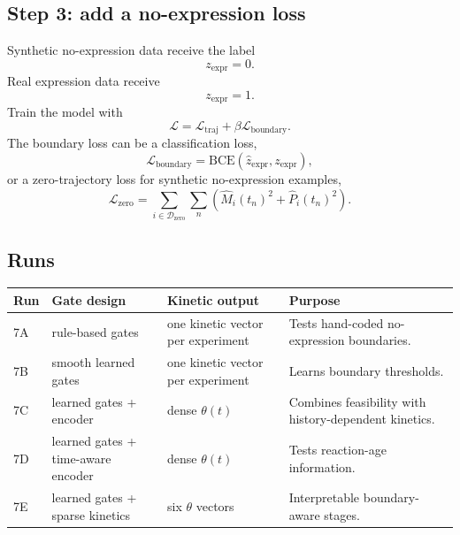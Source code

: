 \documentclass[11pt]{article}
\newcommand{\expr}{\mathrm{expr}}
\newcommand{\BCE}{\mathrm{BCE}}
\begin{document}
\subsection{Step 3: add a no-expression loss}

Synthetic no-expression data receive the label
\begin{equation}
    z_{\expr}=0.
\end{equation}
Real expression data receive
\begin{equation}
    z_{\expr}=1.
\end{equation}
Train the model with
\begin{equation}
    \mathcal{L}=\mathcal{L}_{\mathrm{traj}}+\beta\mathcal{L}_{\mathrm{boundary}}.
\end{equation}
The boundary loss can be a classification loss,
\begin{equation}
    \mathcal{L}_{\mathrm{boundary}}
    =\BCE(\widehat{z}_{\expr},z_{\expr}),
\end{equation}
or a zero-trajectory loss for synthetic no-expression examples,
\begin{equation}
    \mathcal{L}_{\mathrm{zero}}
    =
    \sum_{i\in\mathcal{D}_{\mathrm{zero}}}\sum_n
    \left(\widehat{M}_i(t_n)^2+\widehat{P}_i(t_n)^2\right).
\end{equation}

\subsection{Runs}

\begin{center}
\begin{tabularx}{\textwidth}{lllX}
\toprule
Run & Gate design & Kinetic output & Purpose \\
\midrule
7A & rule-based gates & one kinetic vector per experiment & Tests hand-coded no-expression boundaries. \\
7B & smooth learned gates & one kinetic vector per experiment & Learns boundary thresholds. \\
7C & learned gates + encoder & dense $\theta(t)$ & Combines feasibility with history-dependent kinetics. \\
7D & learned gates + time-aware encoder & dense $\theta(t)$ & Tests reaction-age information. \\
7E & learned gates + sparse kinetics & six $\theta$ vectors & Interpretable boundary-aware stages. \\
\bottomrule
\end{tabularx}
\end{center}
\end{document}
